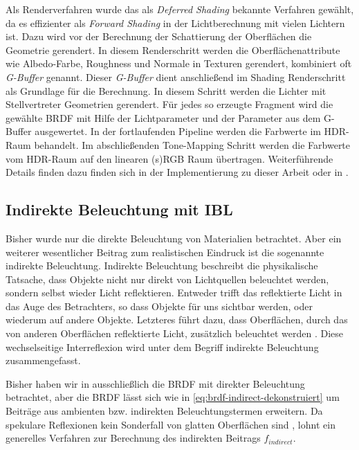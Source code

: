 Als Renderverfahren wurde das als \textit{Deferred Shading} bekannte Verfahren gewählt, da es effizienter als \textit{Forward Shading} in der Lichtberechnung mit vielen Lichtern ist. Dazu wird vor der Berechnung der Schattierung der Oberflächen die Geometrie gerendert. In diesem Renderschritt werden die Oberflächenattribute wie Albedo-Farbe, Roughness und Normale in Texturen gerendert, kombiniert oft \textit{G-Buffer} genannt. Dieser \textit{G-Buffer} dient anschließend im Shading Renderschritt als Grundlage für die Berechnung. In diesem Schritt werden die Lichter mit Stellvertreter Geometrien gerendert. Für jedes so erzeugte Fragment wird die gewählte \ac{BRDF} mit Hilfe der Lichtparameter und der Parameter aus dem G-Buffer ausgewertet. In der fortlaufenden Pipeline werden die Farbwerte im HDR-Raum behandelt. Im abschließenden Tone-Mapping Schritt werden die Farbwerte vom HDR-Raum auf den linearen (s)RGB Raum übertragen. Weiterführende Details finden dazu finden sich in der Implementierung zu dieser Arbeit oder in \cite{Shishkovtsov2005}.

\subsection[Indirekte Beleuchtung]{Indirekte Beleuchtung mit \acl{IBL}}\label{sec:pbr-ibl}

Bisher wurde nur die direkte Beleuchtung von Materialien betrachtet. Aber ein weiterer wesentlicher Beitrag zum realistischen Eindruck ist die sogenannte indirekte Beleuchtung. Indirekte Beleuchtung beschreibt die physikalische Tatsache, dass Objekte nicht nur direkt von Lichtquellen beleuchtet werden, sondern selbst wieder Licht reflektieren. Entweder trifft das reflektierte Licht in das Auge des Betrachters, so dass Objekte für uns sichtbar werden, oder wiederum auf andere Objekte. Letzteres führt dazu, dass Oberflächen, durch das von anderen Oberflächen reflektierte Licht, zusätzlich beleuchtet werden . Diese wechselseitige Interreflexion wird unter dem Begriff indirekte Beleuchtung zusammengefasst.

Bisher haben wir in  ausschließlich die \ac{BRDF} mit direkter Beleuchtung betrachtet, aber die \ac{BRDF} lässt sich wie in \ref{eq:brdf-indirect-dekonstruiert} um Beiträge aus ambienten bzw. indirekten Beleuchtungstermen erweitern. Da spekulare Reflexionen kein Sonderfall von glatten Oberflächen sind \parencite{Hable2010}, lohnt ein generelles Verfahren zur Berechnung des indirekten Beitrags $f_{indirect}$. 

